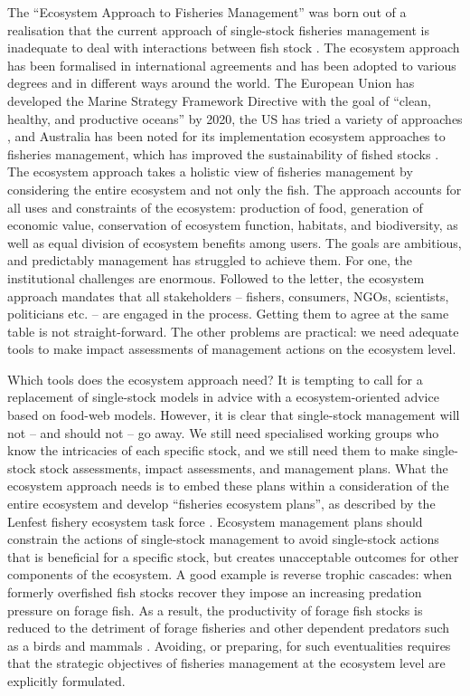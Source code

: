 The ``Ecosystem Approach to Fisheries Management''  was born out of a realisation that the current approach of single-stock fisheries management is inadequate to deal with interactions between fish stock \citep{May1979}.  The ecosystem approach has been formalised in international agreements \citep{FAO2003} and has been adopted to various degrees and in different ways around the world.  The European Union has developed the Marine Strategy Framework Directive with the goal of ``clean, healthy, and productive oceans'' by 2020, the US has tried a variety of approaches \citep{Essington2016}, and Australia has been noted for its implementation ecosystem approaches to fisheries management, which has improved the sustainability of fished stocks \citep{Smith2007b}.  The ecosystem approach takes a holistic view of fisheries management by considering the entire ecosystem and not only the fish.  The approach accounts for all uses and constraints of the ecosystem: production of food, generation of economic value, conservation of ecosystem function, habitats, and biodiversity, as well as equal division of ecosystem benefits among users.  The goals are ambitious, and predictably management has struggled to achieve them.  For one, the institutional challenges are enormous.  Followed to the letter, the ecosystem approach mandates that all stakeholders -- fishers, consumers, NGOs, scientists, politicians etc. -- are engaged in the process.  Getting them to agree at the same table is not straight-forward.  The other problems are practical: we need adequate tools to make impact assessments of management actions on the ecosystem level.

Which tools does the ecosystem approach need?  It is tempting to call for a replacement of single-stock models in advice with a ecosystem-oriented advice based on food-web models.  However, it is clear that  single-stock management will not -- and should not -- go away.  We still need specialised working groups who know the intricacies of each specific stock, and we still need them to make single-stock stock assessments, impact assessments, and management plans.  What the ecosystem approach needs is to embed these plans within a consideration of the entire ecosystem and develop ``fisheries ecosystem plans'', as described by the Lenfest fishery ecosystem task force \citep{Essington2016}.   Ecosystem management plans should constrain the actions of single-stock management to avoid single-stock actions that is beneficial for a specific stock, but creates unacceptable outcomes for other components of the ecosystem.  A good example is reverse trophic cascades:  when formerly overfished fish stocks recover they impose an increasing predation pressure on forage fish.  As a result, the productivity of forage fish stocks is reduced to the detriment of forage fisheries and other dependent predators such as a birds and mammals \citep{vanGemert2018}.  Avoiding, or preparing, for such eventualities requires that the strategic objectives of fisheries management at the ecosystem level are explicitly formulated.  

